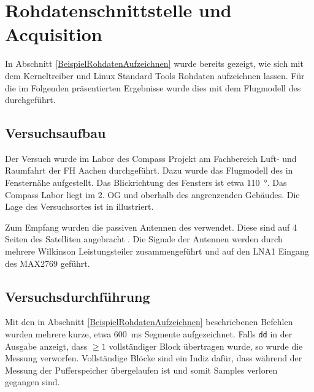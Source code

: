 \section{Rohdatenschnittstelle und Acquisition}
In Abschnitt \ref{BeispielRohdatenAufzeichnen} wurde bereits gezeigt, wie sich mit dem Kerneltreiber und Linux Standard Tools Rohdaten aufzeichnen lassen. Für die im Folgenden präsentierten Ergebnisse wurde dies mit dem Flugmodell des \dscubesat durchgeführt.

\subsection{Versuchsaufbau}
Der Versuch wurde im Labor des Compass Projekt am Fachbereich Luft- und Raumfahrt der FH Aachen durchgeführt. Dazu wurde das Flugmodell des \dscubesat in Fensternähe aufgestellt. Das Blickrichtung des Fensters ist etwa \SI{110}{\degree}. Das Compass Labor liegt im 2. OG und oberhalb des angrenzenden Gebäudes. Die Lage des Versuchsortes ist in  illustriert.

Zum Empfang wurden die passiven Antennen des \dscubesat verwendet. Diese sind auf 4 Seiten des Satelliten angebracht . Die Signale der Antennen werden durch mehrere Wilkinson Leistungsteiler zusammengeführt und auf den LNA1 Eingang des MAX2769 geführt.



\subsection{Versuchsdurchführung}
Mit den in Abschnitt \ref{BeispielRohdatenAufzeichnen} beschriebenen Befehlen wurden mehrere kurze, etwa \SI{600}{\milli\second} Segmente aufgezeichnet. Falls \lstinline$dd$ in der Ausgabe anzeigt, dass $\geq 1$ vollständiger Block übertragen wurde, so wurde die Messung verworfen. Vollständige Blöcke sind ein Indiz dafür, dass während der Messung der Pufferspeicher übergelaufen ist und somit Samples verloren gegangen sind.

